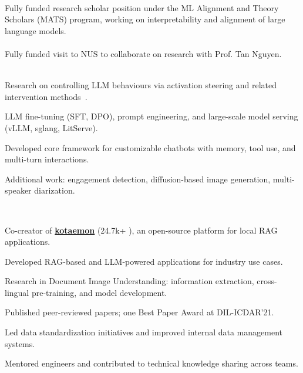 \\
\vspace{-.2em}
Fully funded research scholar position under the ML Alignment and Theory Scholars (MATS)
program, working on interpretability and alignment of large language models.\\

\\
\vspace{-.2em}
Fully funded visit to NUS to collaborate on research with Prof. Tan Nguyen.\\

\\
\vspace{-0.2em}
\begin{xitemize}
\item Research on controlling LLM behaviours via activation steering and related
intervention methods~\cite{vu2025angular}.
    \item LLM fine-tuning (SFT, DPO), prompt engineering, and large-scale model serving (vLLM, sglang, LitServe).
    \item Developed core framework for customizable chatbots with memory, tool use, and multi-turn interactions.
    \item Additional work: engagement detection, diffusion-based image generation, multi-speaker diarization.
\end{xitemize}

\\
\vspace{-0.2em}
\begin{xitemize}
    \item Co-creator of \href{https://github.com/Cinnamon/kotaemon}{\textbf{kotaemon}} (24.7k+ {\scriptsize \faStar}), an open-source platform for local RAG applications.
    \item Developed RAG-based and LLM-powered applications for industry use cases.
    \item Research in Document Image Understanding: information extraction, cross-lingual pre-training, and model development.
    \item Published peer-reviewed papers; one Best Paper Award at DIL-ICDAR'21.
    \item Led data standardization initiatives and improved internal data management systems.
    \item Mentored engineers and contributed to technical knowledge sharing across teams.
\end{xitemize}

